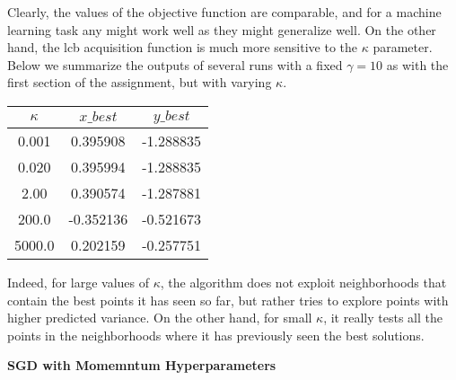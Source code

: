 \documentclass[10pt]{article}
\newcommand{\ybest}{y\_best}
\newcommand{\xbest}{x\_best}
\begin{document}
\begin{multicols}{2}
Clearly, the values of the objective function are comparable, and for a machine learning task any might work well as they might generalize well. On the other hand, the lcb acquisition function is much more sensitive to the $\kappa$ parameter. Below we summarize the outputs of several runs with a fixed $\gamma = 10$ as with the first section of the assignment, but with varying $\kappa$.

\begin{center}
    \begin{tabular}{|c|c|c|} \hline
    $\kappa$ & $\xbest$ & $\ybest$ \\ \hline
    0.001 & 0.395908 & -1.288835 \\ \hline
    0.020 & 0.395994 & -1.288835 \\ \hline
    2.00 & 0.390574 & -1.287881 \\ \hline
    200.0 & -0.352136 & -0.521673 \\ \hline
    5000.0 & 0.202159 & -0.257751 \\ \hline
    \end{tabular}
\end{center}

Indeed, for large values of $\kappa$, the algorithm does not exploit neighborhoods that contain the best points it has seen so far, but rather tries to explore points with higher predicted variance. On the other hand, for small $\kappa$, it really tests all the points in the neighborhoods where it has previously seen the best solutions.



\textbf{SGD with Momemntum Hyperparameters}


\end{multicols}
\end{document}
